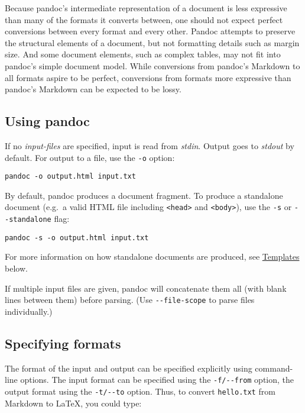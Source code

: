 \documentclass[
]{article}
\begin{document}
Because pandoc's intermediate representation of a document is less
expressive than many of the formats it converts between, one should not
expect perfect conversions between every format and every other. Pandoc
attempts to preserve the structural elements of a document, but not
formatting details such as margin size. And some document elements, such
as complex tables, may not fit into pandoc's simple document model.
While conversions from pandoc's Markdown to all formats aspire to be
perfect, conversions from formats more expressive than pandoc's Markdown
can be expected to be lossy.

\hypertarget{using-pandoc}{%
\subsection{Using pandoc}\label{using-pandoc}}

If no \emph{input-files} are specified, input is read from \emph{stdin}.
Output goes to \emph{stdout} by default. For output to a file, use the
\texttt{-o} option:

\begin{verbatim}
pandoc -o output.html input.txt
\end{verbatim}

By default, pandoc produces a document fragment. To produce a standalone
document (e.g.~a valid HTML file including
\texttt{\textless{}head\textgreater{}} and
\texttt{\textless{}body\textgreater{}}), use the \texttt{-s} or
\texttt{-\/-standalone} flag:

\begin{verbatim}
pandoc -s -o output.html input.txt
\end{verbatim}

For more information on how standalone documents are produced, see
\protect\hyperlink{templates}{Templates} below.

If multiple input files are given, pandoc will concatenate them all
(with blank lines between them) before parsing. (Use
\texttt{-\/-file-scope} to parse files individually.)

\hypertarget{specifying-formats}{%
\subsection{Specifying formats}\label{specifying-formats}}

The format of the input and output can be specified explicitly using
command-line options. The input format can be specified using the
\texttt{-f/-\/-from} option, the output format using the
\texttt{-t/-\/-to} option. Thus, to convert \texttt{hello.txt} from
Markdown to LaTeX, you could type:
\end{document}
